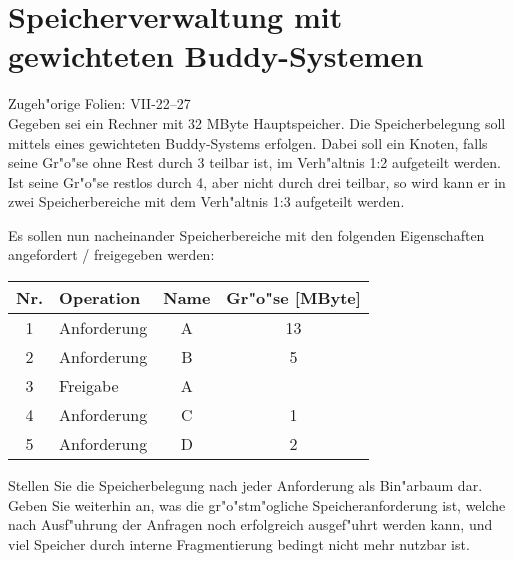 \section{Speicherverwaltung mit gewichteten Buddy-Systemen}

Zugeh"orige Folien:  VII-22--27 \\

Gegeben sei ein Rechner mit 32 MByte Hauptspeicher.  Die
Speicherbelegung soll mittels eines gewichteten Buddy-Systems
erfolgen.  Dabei soll ein Knoten, falls seine Gr"o"se ohne Rest durch
3 teilbar ist, im Verh"altnis 1:2 aufgeteilt werden.  Ist seine
Gr"o"se restlos durch 4, aber nicht durch drei teilbar, so wird kann
er in zwei Speicherbereiche mit dem Verh"altnis 1:3 aufgeteilt werden.

Es sollen nun nacheinander Speicherbereiche mit den folgenden
Eigenschaften angefordert / freigegeben werden:

\begin{center}
  \begin{tabular}{|c|l|c|c|}
    \hline
    Nr. & Operation   & Name & Gr"o"se [MByte] \\
    \hline \hline
    1   & Anforderung & A    & 13 \\
    2   & Anforderung & B    & 5  \\
    3   & Freigabe    & A    &    \\
    4   & Anforderung & C    & 1  \\
    5   & Anforderung & D    & 2  \\
    \hline
  \end{tabular}
\end{center}

Stellen Sie die Speicherbelegung nach jeder Anforderung als Bin"arbaum
dar.  Geben Sie weiterhin an, was die gr"o"stm"ogliche
Speicheranforderung ist, welche nach Ausf"uhrung der Anfragen noch
erfolgreich ausgef"uhrt werden kann, und viel Speicher durch interne
Fragmentierung bedingt nicht mehr nutzbar ist.

